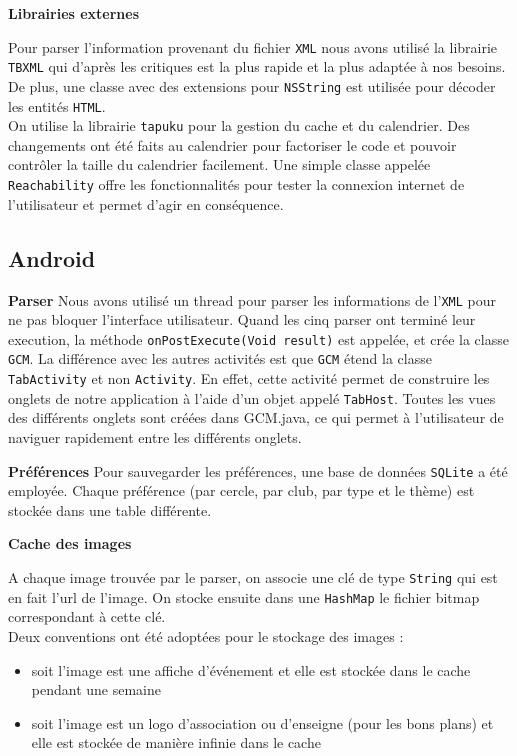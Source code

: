 \documentclass[a4paper, 11px]{article}
\begin{document}
{\bf Librairies externes}

Pour parser l'information provenant du fichier \texttt{XML} nous avons utilisé la librairie \texttt{TBXML} qui d'après les critiques est la plus rapide et la plus adaptée à nos besoins. De plus, une classe avec des extensions pour \texttt{NSString} est utilisée pour décoder les entités \texttt{HTML}.\\
\indent On utilise la librairie \texttt{tapuku} pour la gestion du cache et du calendrier. Des changements ont été faits au calendrier pour factoriser le code et pouvoir contrôler la taille du calendrier facilement.
Une simple classe appelée \texttt{Reachability} offre les fonctionnalités pour tester la connexion internet de l'utilisateur et permet d'agir en conséquence.


\subsection{Android}
{\bf Parser}
Nous avons utilisé un thread pour parser les informations de l'\texttt{XML} pour ne pas bloquer l'interface utilisateur. Quand les cinq parser ont terminé leur execution, la méthode \texttt{onPostExecute(Void result)} est appelée, et crée la classe \texttt{GCM}. La différence avec les autres activités est que \texttt{GCM} étend la classe \texttt{TabActivity} et non \texttt{Activity}. En effet, cette activité permet de construire les onglets de notre application à l'aide d'un objet appelé \texttt{TabHost}. Toutes les vues des différents onglets sont créées dans GCM.java, ce qui permet à l'utilisateur de naviguer rapidement entre les différents onglets.


{\bf Préférences}
Pour sauvegarder les préférences, une base de données \texttt{SQLite} a été employée. Chaque préférence (par cercle, par club, par type et le thème) est stockée dans une table différente.
 
{\bf Cache des images}

A chaque image trouvée par le parser, on associe une clé de type \texttt{String} qui est en fait l'url de l'image. On stocke ensuite dans une \texttt{HashMap} le fichier bitmap correspondant à cette clé.\\
Deux conventions ont été adoptées pour le stockage des images :
\begin{itemize}
\item soit l'image est une affiche d'événement et elle est stockée dans le cache pendant une semaine
\item soit l'image est un logo d'association ou d'enseigne (pour les bons plans) et elle est stockée de manière infinie dans le cache\\
\end{itemize}
\end{document}
